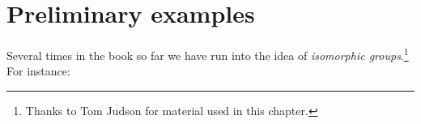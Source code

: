 
\section{Preliminary examples}\label{isomorph_defn_ex}

Several times in the book so far we have run into the idea of  \emph{isomorphic groups}.\footnote{Thanks to Tom Judson for material used in this chapter.}  For instance:

